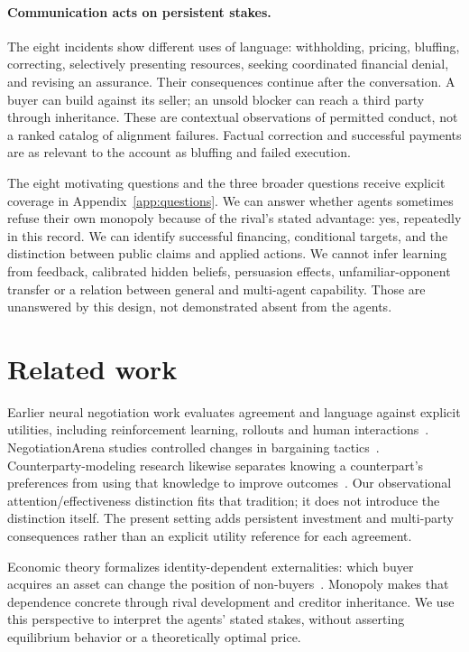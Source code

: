 \paragraph{Communication acts on persistent stakes.}
The eight incidents show different uses of language: withholding, pricing, bluffing, correcting, selectively presenting resources, seeking coordinated financial denial, and revising an assurance. Their consequences continue after the conversation. A buyer can build against its seller; an unsold blocker can reach a third party through inheritance. These are contextual observations of permitted conduct, not a ranked catalog of alignment failures. Factual correction and successful payments are as relevant to the account as bluffing and failed execution.

The eight motivating questions and the three broader questions receive explicit coverage in Appendix~\ref{app:questions}. We can answer whether agents sometimes refuse their own monopoly because of the rival's stated advantage: yes, repeatedly in this record. We can identify successful financing, conditional targets, and the distinction between public claims and applied actions. We cannot infer learning from feedback, calibrated hidden beliefs, persuasion effects, unfamiliar-opponent transfer or a relation between general and multi-agent capability. Those are unanswered by this design, not demonstrated absent from the agents.

\section{Related work}
Earlier neural negotiation work evaluates agreement and language against explicit utilities, including reinforcement learning, rollouts and human interactions~\cite{lewis2017deal,he2018decoupling}. NegotiationArena studies controlled changes in bargaining tactics~\cite{bianchi2024negotiationarena}. Counterparty-modeling research likewise separates knowing a counterpart's preferences from using that knowledge to improve outcomes~\cite{cosentino2026counterparty}. Our observational attention/effectiveness distinction fits that tradition; it does not introduce the distinction itself. The present setting adds persistent investment and multi-party consequences rather than an explicit utility reference for each agreement.

Economic theory formalizes identity-dependent externalities: which buyer acquires an asset can change the position of non-buyers~\cite{jehiel1996externalities}. Monopoly makes that dependence concrete through rival development and creditor inheritance. We use this perspective to interpret the agents' stated stakes, without asserting equilibrium behavior or a theoretically optimal price.

